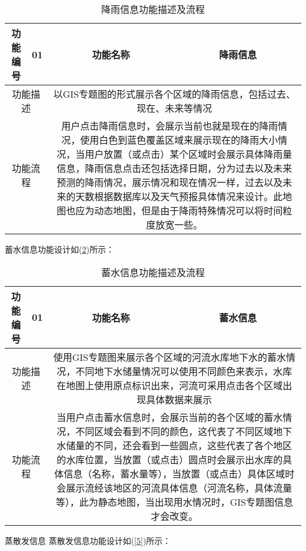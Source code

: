 \begin{table}[H]
	\centering
	\caption[降雨信息]{降雨信息功能描述及流程}
	\label{3}
	\begin{tabular}{|c|c|c|c|}
		
		\hline
		功能编号&01&功能名称&降雨信息\\
		\hline
		\multicolumn{2}{|c|}{功能描述}&\multicolumn{2}{c|}{\multirow{1}{0.7\textwidth}{以GIS专题图的形式展示各个区域的降雨信息，包括过去、现在、未来等情况}}\\[4ex]
		\hline
		\multicolumn{2}{|c|}{功能流程}&\multicolumn{2}{c|}{\multirow{1}{0.7\textwidth}{用户点击降雨信息时，会展示当前也就是现在的降雨情况，使用白色到蓝色覆盖区域来展示现在的降雨大小情况，当用户放置（或点击）某个区域时会展示具体降雨量信息，降雨信息点击还包括选择日期，分为过去以及未来预测的降雨情况，展示情况和现在情况一样，过去以及未来的天数根据数据库以及天气预报具体情况来设计。此地图也应为动态地图，但是由于降雨特殊情况可以将时间粒度放宽一些。}}\\[16ex]
		\hline
		
		
	\end{tabular}
\end{table}
蓄水信息功能设计如(\ref{4})所示：

\begin{table}[H]
	\centering
	\caption[蓄水信息]{蓄水信息功能描述及流程}
	\label{4}
	\begin{tabular}{|c|c|c|c|}
		
		\hline
		功能编号&01&功能名称&蓄水信息\\
		\hline
		\multicolumn{2}{|c|}{功能描述}&\multicolumn{2}{c|}{\multirow{1}{0.7\textwidth}{使用GIS专题图来展示各个区域的河流水库地下水的蓄水情况，不同地下水储量情况可以使用不同颜色来表示，水库在地图上使用原点标识出来，河流可采用点击各个区域出现具体数据来展示}}\\[10ex]
		\hline
		\multicolumn{2}{|c|}{功能流程}&\multicolumn{2}{c|}{\multirow{1}{0.7\textwidth}{当用户点击蓄水信息时，会展示当前的各个区域的蓄水情况，不同区域会看到不同的颜色，这代表了不同区域地下水储量的不同，还会看到一些圆点，这些代表了各个地区的水库位置，当放置（或点击）圆点时会展示出水库的具体信息（名称，蓄水量等），当放置（或点击）具体区域时会展示流经该地区的河流具体信息（河流名称，具体流量等），此为静态地图，当出现用水情况时，GIS专题图信息才会改变。}}\\[16ex]
		\hline
		
		
	\end{tabular}
\end{table}
蒸散发信息
蒸散发信息功能设计如(\ref{5})所示：


